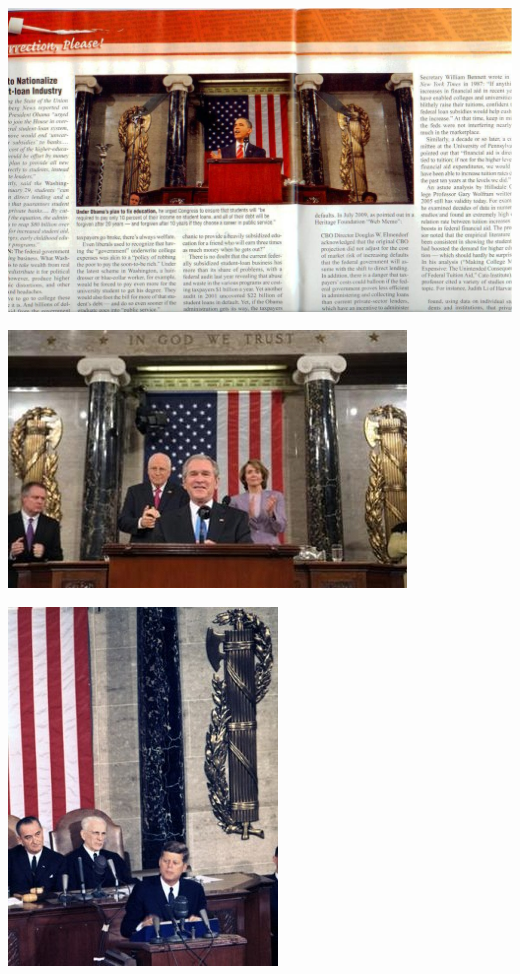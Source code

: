 \begin{frame}
    \centering
    \includegraphics[width=.9\textwidth]{img/obama-fasces.jpg} \\
\end{frame}

\begin{frame}
    \centering
    \includegraphics[width=.9\textwidth]{img/fasces/fasces_congress.jpg} \\
\end{frame}

\begin{frame}
    \centering
    \includegraphics[height=.9\textheight]{img/fasces/jfk.jpg} \\
\end{frame}

